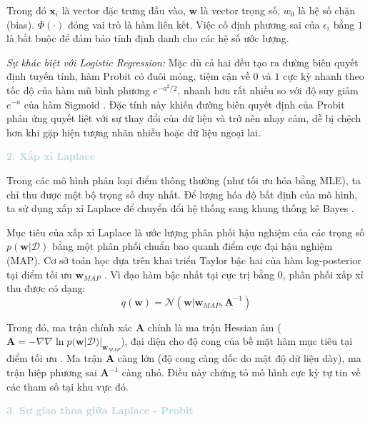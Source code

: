 Trong đó $\mathbf{x}_i$ là vector đặc trưng đầu vào, $\mathbf{w}$ là vector trọng số, $w_0$ là hệ số chặn (bias). $\Phi(\cdot)$ đóng vai trò là hàm liên kết. Việc cố định phương sai của $\epsilon_i$ bằng $1$ là bắt buộc để đảm bảo tính định danh cho các hệ số ước lượng.

\textit{Sự khác biệt với Logistic Regression:} Mặc dù cả hai đều tạo ra đường biên quyết định tuyến tính, hàm Probit có đuôi mỏng, tiệm cận về $0$ và $1$ cực kỳ nhanh theo tốc độ của hàm mũ bình phương $e^{-a^2/2}$, nhanh hơn rất nhiều so với độ suy giảm $e^{-a}$ của hàm Sigmoid \cite{bishop2006pattern}. Đặc tính này khiến đường biên quyết định của Probit phản ứng quyết liệt với sự thay đổi của dữ liệu và trở nên nhạy cảm, dễ bị chệch hơn khi gặp hiện tượng nhãn nhiễu  hoặc dữ liệu ngoại lai.

\vspace{0.5em}
\noindent\textcolor{lightblue}{\textbf{2. Xấp xỉ Laplace}}
\vspace{0.5em}

Trong các mô hình phân loại điểm thông thường (như tối ưu hóa bằng MLE), ta chỉ thu được một bộ trọng số duy nhất. Để lượng hóa độ bất định của mô hình, ta sử dụng xấp xỉ Laplace để chuyển đổi hệ thống sang khung thống kê Bayes \cite{bishop2006pattern, fisher1925theory}.

Mục tiêu của xấp xỉ Laplace là ước lượng phân phối hậu nghiệm của các trọng số $p(\mathbf{w} | \mathcal{D})$ bằng một phân phối chuẩn bao quanh điểm cực đại hậu nghiệm (MAP). Cơ sở toán học dựa trên khai triển Taylor bậc hai của hàm log-posterior tại điểm tối ưu $\mathbf{w}_{MAP}$ \cite{fisher1925theory}. Vì đạo hàm bậc nhất tại cực trị bằng $0$, phân phối xấp xỉ thu được có dạng:
\begin{equation}
    q(\mathbf{w}) = \mathcal{N}(\mathbf{w} | \mathbf{w}_{MAP}, \mathbf{A}^{-1})
\end{equation}

Trong đó, ma trận chính xác $\mathbf{A}$ chính là ma trận Hessian âm ($\mathbf{A} = -\nabla \nabla \ln p(\mathbf{w} | \mathcal{D}) |_{\mathbf{w}_{MAP}}$), đại diện cho độ cong của bề mặt hàm mục tiêu tại điểm tối ưu \cite{fisher1925theory}. Ma trận $\mathbf{A}$ càng lớn (độ cong càng dốc do mật độ dữ liệu dày), ma trận hiệp phương sai $\mathbf{A}^{-1}$ càng nhỏ. Điều này chứng tỏ mô hình cực kỳ tự tin về các tham số tại khu vực đó.

\vspace{0.5em}
\noindent\textcolor{lightblue}{\textbf{3. Sự giao thoa giữa Laplace - Probit}}
\vspace{0.5em}

